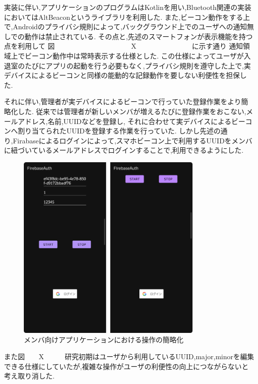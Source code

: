実装に伴い,アプリケーションのプログラムはKotlinを用い,Bluetooth関連の実装においてはAltBeaconというライブラリを利用した.
また,ビーコン動作をする上で,Androidのプライバシ規則によって,バックグラウンド上でのユーザへの通知無しでの動作は禁止されている.
その点と,先述のスマートフォンが表示機能を持つ点を利用して 図　　　　　　　　　　　X　　　　　　　　に示す通り   通知領域上でビーコン動作中は常時表示する仕様とした.
この仕様によってユーザが入退室のたびにアプリの起動を行う必要もなく,プライバシ規則を遵守した上で,実デバイスによるビーコンと同様の能動的な記録動作を要しない利便性を担保した.




それに伴い,管理者が実デバイスによるビーコンで行っていた登録作業をより簡略化した.
従来では管理者が新しいメンバが増えるたびに登録作業をおこない,メールアドレス,名前,UUIDなどを登録し,
それに合わせて実デバイスによるビーコンへ割り当てられたUUIDを登録する作業を行っていた.
しかし先述の通り,Firabaseによるログインによって,スマホビーコン上で利用するUUIDをメンバに紐づいているメールアドレスでログインすることで,利用できるようにした.

 \begin{figure}[tbh]
   \centering
   \includegraphics[width=9cm]{image/AppBeforeAfter.png}
   \caption{メンバ向けアプリケーションにおける操作の簡略化}
   \label{multipleBPM}
 \end{figure}
また図　　X　　　研究初期はユーザから利用しているUUID,major,minorを編集できる仕様にしていたが,複雑な操作がユーザの利便性の向上につながらないと考え取り消した.





